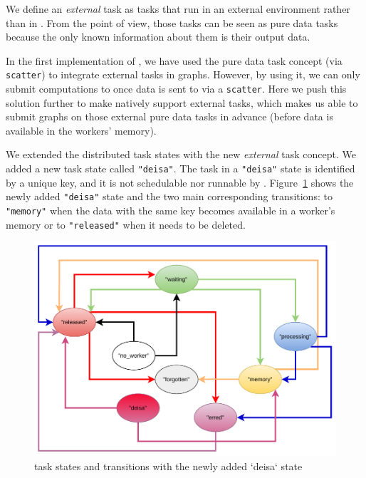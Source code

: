 We define an \textit{external} task as tasks that run in an external environment rather than in \dask. 
From the \dask point of view, those tasks can be seen as pure data tasks because the only known information about them is their output data.  

In the first implementation of \deisa, we have used the pure data task concept (via \texttt{scatter}) to integrate external tasks in \dask graphs. 
However, by using it, we can only submit computations to \dask once data is sent to \dask via a \texttt{scatter}. 
Here we push this solution further to make \dask natively support external tasks, which makes us able to submit graphs on those external pure data tasks in advance (before data is available in the workers' memory). 

We extended the \dask distributed task states with the new \textit{external} task concept. We added a new task state called \texttt{"deisa"}. The task in a \texttt{"deisa"} state is identified by a unique key, and it is not schedulable nor runnable by \dask. 
Figure~\ref{figdasktaskstates} shows the newly added \texttt{"deisa"} state and the two main corresponding transitions: to \texttt{"memory"} when the data with the same key becomes available in a worker's memory or to \texttt{"released"} when it needs to be deleted. 

\begin{figure}[h!]\centering
\includegraphics[scale=0.5]{figures/Dask-TaskStatesSheduler.pdf}
\caption{\dask task states and transitions with the newly added `deisa` state}
\label{figdasktaskstates}
\end{figure}

